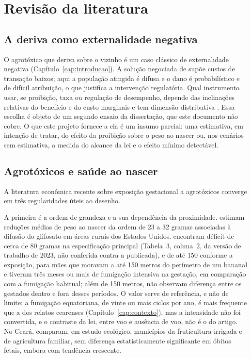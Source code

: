 
\chapter{Revisão da literatura}
\label{cap:referencial}

\section{A deriva como externalidade negativa}

O agrotóxico que deriva sobre o vizinho é um caso clássico de externalidade
negativa (Capítulo~\ref{cap:introducao}). A solução negociada de  supõe custos de
transação baixos; aqui a população atingida é difusa e o dano é
probabilístico e de difícil atribuição, o que justifica a intervenção
regulatória. Qual instrumento usar, se proibição, taxa ou regulação de
desempenho, depende das inclinações relativas do benefício e do custo
marginais \cite{weitzman1974} e tem dimensão distributiva
\cite{lichtenberg1988,helfand1995}. Essa escolha é objeto de um
segundo ensaio da dissertação, que este documento não cobre. O que este
projeto fornece a ela é um insumo parcial: uma estimativa, em intenção de
tratar, do efeito da proibição sobre o peso ao nascer ou, nos cenários sem
estimativa, a medida do alcance da lei e o efeito mínimo detectável.

\section{Agrotóxicos e saúde ao nascer}

A literatura econômica recente sobre exposição gestacional a agrotóxicos
converge em três regularidades úteis ao desenho.

A primeira é a ordem de grandeza e a sua dependência da proximidade.
 estimam reduções médias de peso ao nascer da
ordem de 23 a 32 gramas associadas à difusão do glifosato em áreas rurais dos
Estados Unidos.  encontram déficit de cerca de
80 gramas na especificação principal (Tabela~3, coluna~2, da versão de
trabalho de 2023, não conferida contra a publicada), e de até 150 conforme a exposição, para mães que moravam a até 150
metros do perímetro de um bananal e tiveram três meses ou mais de fumigação
intensiva na gestação, em comparação com a fumigação habitual; além de 150
metros, não observam diferença entre os gestados dentro e fora desses períodos.
O valor serve de referência, e não de limite: a fumigação equatoriana, de vinte
ou mais ciclos por ano, é mais frequente que a dos relatos cearenses
(Capítulo~\ref{cap:contexto}), mas a intensidade não foi convertida, e o
contraste da lei, entre voo e ausência de voo, não é o do artigo. No Ceará,
 comparam, em estudo ecológico, municípios da
fruticultura irrigada e de agricultura familiar, sem diferença
estatisticamente significante em óbitos fetais, embora com tendência crescente.

